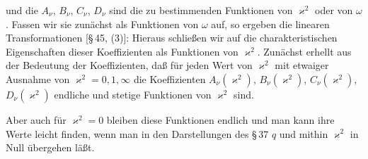 und die $A_\nu$, $B_\nu$, $C_\nu$, $D_\nu$ sind die zu bestimmenden Funktionen von $\varkappa^2$ oder von $\omega$. Fassen wir sie zunächst als Funktionen von $\omega$ auf, so ergeben die linearen Transformationen [\S\,45, (3)]:
Hieraus schließen wir auf die charakteristischen Eigenschaften dieser Koeffizienten als Funktionen von $\varkappa^2$. Zunächst erhellt aus der Bedeutung der Koeffizienten, daß für jeden Wert von $\varkappa^2$ mit etwaiger Ausnahme von $\varkappa^2 = 0, 1, \infty$ die Koeffizienten $A_\nu(\varkappa^2)$, $B_\nu(\varkappa^2)$, $C_\nu(\varkappa^2)$, $D_\nu(\varkappa^2)$ endliche und stetige Funktionen von $\varkappa^2$ sind.

Aber auch für $\varkappa^2 = 0$ bleiben diese Funktionen endlich und man kann ihre Werte leicht finden, wenn man in den Darstellungen des \S\,37 $q$ und mithin $\varkappa^2$ in Null übergehen läßt.
